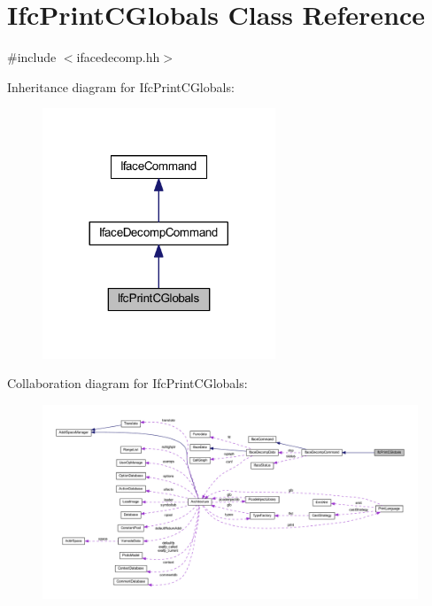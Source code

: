 \hypertarget{class_ifc_print_c_globals}{}\section{Ifc\+Print\+C\+Globals Class Reference}
\label{class_ifc_print_c_globals}


{\ttfamily \#include $<$ifacedecomp.\+hh$>$}



Inheritance diagram for Ifc\+Print\+C\+Globals\+:
\nopagebreak
\begin{figure}[H]
\begin{center}
\leavevmode
\includegraphics[width=197pt]{class_ifc_print_c_globals__inherit__graph}
\end{center}
\end{figure}


Collaboration diagram for Ifc\+Print\+C\+Globals\+:
\nopagebreak
\begin{figure}[H]
\begin{center}
\leavevmode
\includegraphics[width=350pt]{class_ifc_print_c_globals__coll__graph}
\end{center}
\end{figure}

